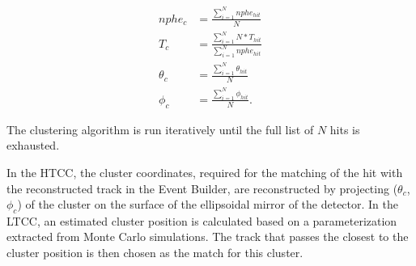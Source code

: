 \begin{eqnarray}
nphe_c &= \frac{\sum_{i=1}^N{nphe_{hit}}}{N} \nonumber \\
T_c &= \frac{\sum_{i=1}^N{N*T_{hit}}}{\sum_{i=1}^N{nphe_{hit}}} \nonumber \\
\theta_c &=\frac{\sum_{i=1}^N{\theta_{hit}}}{N} \nonumber \\
\phi_c &= \frac{\sum_{i=1}^N{\phi_{hit}}}{N}.
\end{eqnarray}

\noindent
The clustering algorithm is run iteratively until the full list of $N$ hits is exhausted.

In the HTCC, the cluster coordinates, required for the matching of the hit with the reconstructed track in the
Event Builder, are reconstructed by projecting  ($\theta_c$, $\phi_c$) of the cluster on the surface of the
ellipsoidal mirror of the detector. In the LTCC, an estimated cluster position is calculated based on a
parameterization extracted from Monte Carlo simulations. The track that passes the closest to the cluster
position is then chosen as the match for this cluster.
